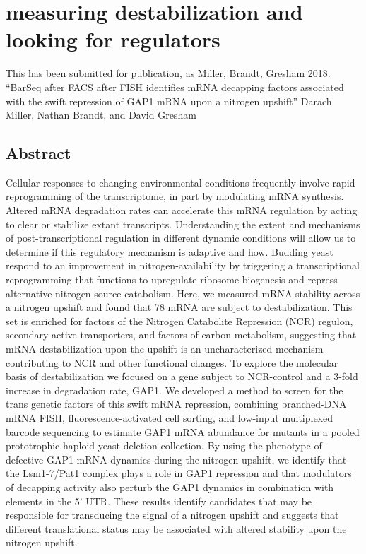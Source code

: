 
\chapter{measuring destabilization and looking for regulators}

This
has been submitted for publication, as Miller, Brandt, Gresham 2018.
“BarSeq after FACS after FISH identifies mRNA decapping factors
associated with the swift repression of GAP1 mRNA upon a nitrogen
upshift” Darach Miller, Nathan Brandt, and David Gresham 

\section{Abstract}

Cellular responses to changing environmental conditions frequently
involve rapid reprogramming of the transcriptome, in part by
modulating mRNA synthesis. Altered mRNA degradation rates can
accelerate this mRNA regulation by acting to clear or stabilize extant
transcripts. Understanding the extent and mechanisms of
post-transcriptional regulation in different dynamic conditions will
allow us to determine if this regulatory mechanism is adaptive and
how. Budding yeast respond to an improvement in nitrogen-availability
by triggering a transcriptional reprogramming that functions to
upregulate ribosome biogenesis and repress alternative nitrogen-source
catabolism. Here, we measured mRNA stability across a nitrogen upshift
and found that 78 mRNA are subject to destabilization. This set is
enriched for factors of the Nitrogen Catabolite Repression (NCR)
regulon, secondary-active transporters, and factors of carbon
metabolism, suggesting that mRNA destabilization upon the upshift is
an uncharacterized mechanism contributing to NCR and other functional
changes. To explore the molecular basis of destabilization we focused
on a gene subject to NCR-control and a 3-fold increase in degradation
rate, GAP1. We developed a method to screen for the trans genetic
factors of this swift mRNA repression, combining branched-DNA mRNA
FISH, fluorescence-activated cell sorting, and low-input multiplexed
barcode sequencing to estimate GAP1 mRNA abundance for mutants in a
pooled prototrophic haploid yeast deletion collection. By using the
phenotype of defective GAP1 mRNA dynamics during the nitrogen upshift,
we identify that the Lsm1-7/Pat1 complex plays a role in GAP1
repression and that modulators of decapping activity also perturb the
GAP1 dynamics in combination with elements in the 5’ UTR. These
results identify candidates that may be responsible for transducing
the signal of a nitrogen upshift and suggests that different
translational status may be associated with altered stability upon the
nitrogen upshift.  

